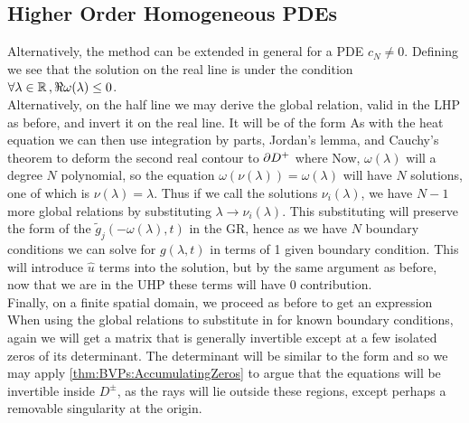 \documentclass{article}
\begin{document}
\subsection{Higher Order Homogeneous PDEs}
Alternatively, the method can be extended in general for a PDE
$c_N \neq 0$. Defining 
we see that the solution on the real line is 
under the condition $\forall \lambda \in \mathbb{R} \,, \Re \omega(\lambda) \leq 0 $. \\
Alternatively, on the half line we may derive the global relation, valid in the LHP as before, and invert it on the real line. It will be of the form 
As with the heat equation we can then use integration by parts, Jordan's lemma, and Cauchy's theorem to deform the second real contour to $\partial D^+$ where
Now, $\omega(\lambda)$ will a degree $N$ polynomial, so the equation $\omega(\nu(\lambda)) = \omega(\lambda)$ will have $N$ solutions, one of which is $\nu(\lambda) = \lambda$. Thus if we call the solutions $\nu_i(\lambda)$, we have $N-1$ more global relations by substituting $\lambda \to \nu_i(\lambda)$. This substituting will preserve the form of the $\tilde{g}_j(-\omega(\lambda),t)$ in the GR, hence as we have $N$ boundary conditions we can solve for $g(\lambda,t)$ in terms of 1 given boundary condition. This will introduce $\hat{u}$ terms into the solution, but by the same argument as before, now that we are in the UHP these terms will have 0 contribution. \\
Finally, on a finite spatial domain, we proceed as before to get an expression 
When using the global relations to substitute in for known boundary conditions, again we will get a matrix that is generally invertible except at a few isolated zeros of its determinant. The determinant will be similar to the form 
and so we may apply \ref{thm:BVPs:AccumulatingZeros} to argue that the equations will be invertible inside $D^\pm$, as the rays will lie outside these regions, except perhaps a removable singularity at the origin. 
\end{document}
